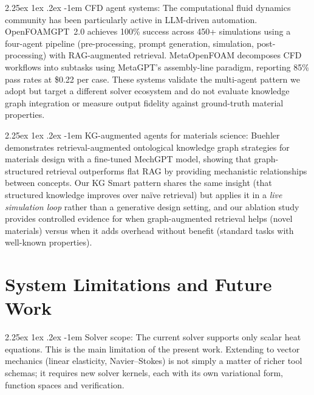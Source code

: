 \documentclass[preprint,review,12pt]{elsarticle}
\makeatletter
\renewcommand\paragraph{\@startsection{paragraph}{4}{\z@}%
  {2.25ex \@plus1ex \@minus.2ex}%
  {-1em}%
  {\normalfont\normalsize\bfseries}}
\newif\ifrevisionsvisible
\newcommand{\revised}[1]{%
  \ifrevisionsvisible\textcolor{revisionred}{#1}\else#1\fi}
\makeatother
\begin{document}
\paragraph{CFD agent systems:}
The computational fluid dynamics community has been particularly active
in LLM-driven automation.  OpenFOAMGPT~2.0 \citep{chen2025openfoamgpt2}
achieves 100\% success across 450+ simulations using a four-agent
pipeline (pre-processing, prompt generation, simulation, post-processing)
with RAG-augmented retrieval.
MetaOpenFOAM \citep{chen2024metaopenfoam} decomposes CFD workflows into
subtasks using MetaGPT's \citep{hong2024metagpt} assembly-line paradigm,
reporting 85\% pass
rates at \$0.22 per case.
These systems validate the multi-agent pattern we adopt but target a
different solver ecosystem and do not evaluate knowledge graph
integration or measure output fidelity against ground-truth material
properties.

\paragraph{KG-augmented agents for materials science:}
Buehler~\cite{buehler2024mechgpt} demonstrates retrieval-augmented ontological
knowledge graph strategies for materials design with a fine-tuned
MechGPT model, showing that graph-structured retrieval
outperforms flat RAG by providing mechanistic relationships between
concepts.  Our KG Smart pattern shares the same insight (that structured
knowledge improves over na\"ive retrieval) but applies it in a
\emph{live simulation loop} rather than a generative design setting,
and our ablation study provides controlled evidence for when
graph-augmented retrieval helps (novel materials) versus when it adds
overhead without benefit (standard tasks with well-known properties).

\section{System Limitations and Future Work}
\label{sec:limitations}

\paragraph{Solver scope:}
The current solver supports only scalar heat equations.  \revised{This is the main limitation of the present work.  Extending to
vector mechanics (linear elasticity, Navier--Stokes) is not simply a
matter of richer tool schemas; it requires new solver kernels, each with
its own variational form, function spaces and verification.}
\end{document}
